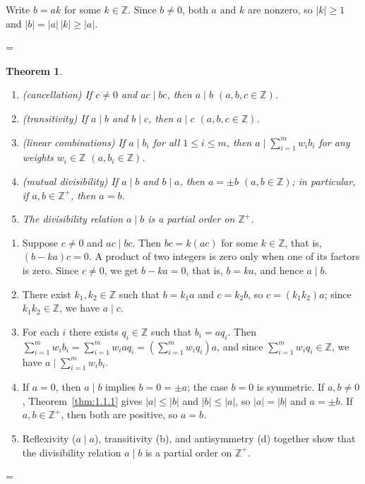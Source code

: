 \documentclass[11pt]{article}
\makeatletter
\theoremstyle{ntstyle}
\newtheorem{theorem}{Theorem}[subsection]
\newcommand{\statementitems}{\mbox{}}
\let\nt@closedisplay\]
\def\nt@guardedclose{\@ifnextchar\par{\nt@closeafterpar}{\@ifnextchar\end{\postdisplaypenalty\@M\nt@closedisplay}{\nt@closedisplay}}}
\def\nt@closeafterpar\par{\@ifnextchar\par{\nt@closeafterpar}{\@ifnextchar\end{\postdisplaypenalty\@M\nt@closedisplay\par}{\nt@closedisplay\par}}}
\renewenvironment{proof}[1][\proofname]{\par
  \pushQED{\qed}\normalfont\topsep\medskipamount\edef\nt@afterproof{\@endparpenalty=\the\@endparpenalty\relax}\@beginparpenalty\@M\@endparpenalty\@M\let\]\nt@guardedclose\trivlist\item[]\textit{#1\@addpunct{.}} \ignorespaces}{\ifvmode\addpenalty\@M\fi\popQED\nt@afterproof\endtrivlist\@endpefalse}
\makeatother
\begin{document}
\begin{proof} Write $b = ak$ for some $k\in\mathbb{Z}$. Since $b \neq 0$, both $a$ and $k$
	are nonzero, so $|k| \ge 1$ and $|b| = |a|\,|k| \ge |a|$.

\end{proof}
\begin{theorem}\label{thm:1.1.2}\statementitems

	\begin{enumerate}[label={\alph*)}]
		\item (cancellation) If $c \neq 0$ and $ac \mid bc$, then $a \mid
			      b$ $(a, b, c \in \mathbb{Z})$.
		\item (transitivity) If $a \mid b$ and $b \mid c$, then $a \mid c$
		      $(a, b, c \in \mathbb{Z})$.
		\item (linear combinations) If $a \mid b_i$ for all $1 \le i \le
			      m$, then $a \mid \sum_{i=1}^{m} w_i b_i$ for any weights $w_i \in
			      \mathbb{Z}$ $(a, b_i \in \mathbb{Z})$.
		\item (mutual divisibility) If $a \mid b$ and $b \mid a$, then $a = \pm
			      b$ $(a, b \in \mathbb{Z})$; in particular, if $a, b \in
			      \mathbb{Z}^+$, then $a = b$.
		\item The divisibility relation $a \mid b$ is a partial order on $\mathbb{Z}^+$.
	\end{enumerate}

\end{theorem}

\begin{proof}

	\begin{enumerate}[label={\alph*)}]
		\item Suppose $c \neq 0$ and $ac \mid bc$. Then $bc = k(ac)$ for
		      some $k \in \mathbb{Z}$, that is, $(b - ka)c = 0$. A product of two integers is zero only when one of its
		      factors is zero. Since $c \neq 0$, we get $b - ka = 0$, that is, $b = ka$, and hence $a \mid b$.
		\item There exist $k_1, k_2 \in \mathbb{Z}$ such that $b = k_1 a$
		      and $c = k_2 b$, so $c = (k_1 k_2) a$; since $k_1 k_2 \in
			      \mathbb{Z}$, we have $a \mid c$.
		\item For each $i$ there exists $q_i \in \mathbb{Z}$ such that
		      $b_i = a q_i$. Then $\sum_{i=1}^{m} w_i b_i = \sum_{i=1}^{m} w_i a
			      q_i = \left(\sum_{i=1}^{m} w_i q_i\right) a$, and since
		      $\sum_{i=1}^{m} w_i q_i \in \mathbb{Z}$, we have $a \mid
			      \sum_{i=1}^{m} w_i b_i$.
		\item If $a = 0$, then $a \mid b$ implies $b = 0 = \pm a$;
		      the case $b = 0$ is symmetric. If $a, b \neq 0$, Theorem~\ref{thm:1.1.1} gives
		      $|a| \le |b|$ and $|b| \le |a|$, so $|a| = |b|$ and $a = \pm b$.
		      If $a, b \in \mathbb{Z}^+$, then both are positive, so $a = b$.
		\item Reflexivity ($a \mid a$), transitivity (b), and antisymmetry
		      (d) together show that the divisibility relation $a \mid b$ is a partial order on
		      $\mathbb{Z}^+$.
	\end{enumerate}

\end{proof}
\end{document}
